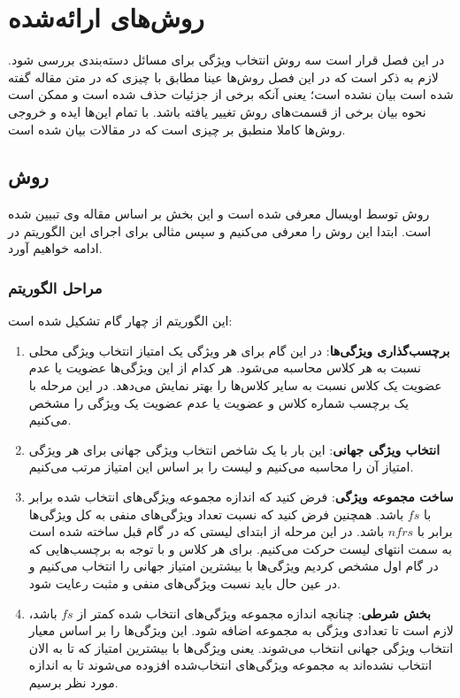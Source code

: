 \chapter{روش‌های ارائه‌شده}
در این فصل قرار است سه روش انتخاب ویژگی برای مسائل دسته‌بندی بررسی شود. لازم به ذکر است که در این فصل روش‌ها عینا مطابق با چیزی که در متن مقاله گفته شده است بیان نشده است؛ یعنی آنکه برخی از جزئیات حذف شده است و ممکن است نحوه بیان برخی از قسمت‌های روش تغییر یافته باشد. با تمام این‌ها ایده و خروجی روش‌ها کاملا منطبق بر چیزی است که در مقالات بیان شده است.


\section{روش } 
روش  توسط اویسال\cite{uysal2016improved} معرفی شده است و این بخش بر اساس مقاله وی تبیین شده است. ابتدا این روش را معرفی می‌کنیم و سپس مثالی برای اجرای این الگوریتم در ادامه خواهیم آورد.
\subsection{مراحل الگوریتم}
این الگوریتم از چهار گام تشکیل شده است:
\begin{enumerate}
\item \textbf{برچسب‌گذاری ویژگی‌ها}: در این گام برای هر ویژگی یک امتیاز انتخاب ویژگی محلی نسبت به هر کلاس محاسبه می‌شود. هر کدام از این ویژگی‌ها عضویت یا عدم عضویت یک کلاس نسبت به سایر کلاس‌ها را بهتر نمایش می‌دهد. در این مرحله با یک برچسب شماره کلاس و عضویت یا عدم عضویت یک ویژگی را مشخص می‌کنیم. 
\item \textbf{انتخاب ویژگی جهانی}: این بار با یک شاخص انتخاب ویژگی جهانی برای هر ویژگی امتیاز آن را محاسبه می‌کنیم و لیست را بر اساس این امتیاز مرتب می‌کنیم. 
\item \textbf{ساخت مجموعه ویژگی}: فرض کنید که اندازه مجموعه ویژگی‌های انتخاب شده برابر با 
$fs$
باشد. همچنین فرض کنید که نسبت تعداد ویژگی‌های منفی به کل ویژگی‌ها برابر با
$nfrs$
باشد. در این مرحله از ابتدای لیستی که در گام قبل ساخته شده است به سمت انتهای لیست حرکت می‌کنیم. برای هر کلاس و با توجه به برچسب‌هایی که در گام اول مشخص کردیم ویژگی‌ها با بیشترین امتیاز جهانی را انتخاب می‌کنیم و در عین حال باید نسبت ویژگی‌های منفی و مثبت رعایت شود.
\item \textbf{بخش شرطی}: چنانچه اندازه مجموعه ویژگی‌های انتخاب شده کمتر از $fs$ باشد، لازم است تا تعدادی ویژگی به مجموعه اضافه شود. این ویژگی‌ها را بر اساس معیار انتخاب ویژگی جهانی انتخاب می‌شوند. یعنی ویژگی‌ها با بیشترین امتیاز که تا به الان انتخاب نشده‌اند به مجموعه ویژگی‌های انتخاب‌شده افزوده می‌شوند تا به اندازه مورد نظر برسیم.
\end{enumerate}


